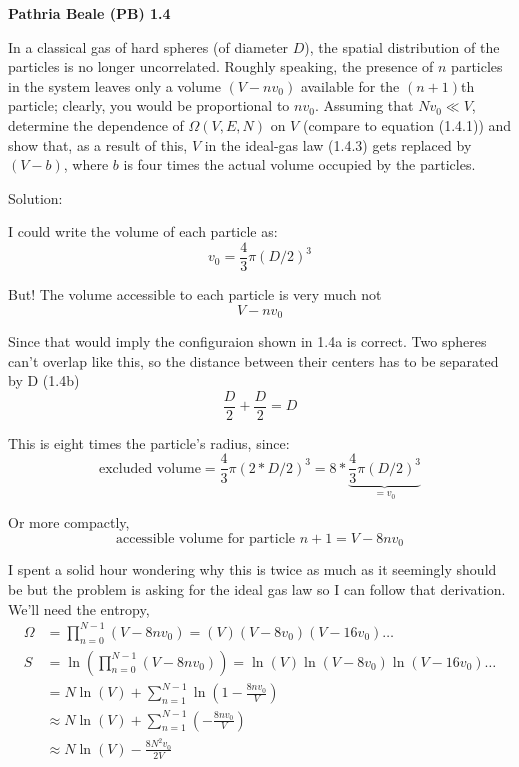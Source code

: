 \newpage
\begin{homeworkProblem}
    \textbf{Pathria Beale (PB) 1.4}

    In a classical gas of hard spheres (of diameter $D$), the spatial distribution of the particles is no longer uncorrelated. Roughly speaking, the presence of $n$ particles in the system leaves only a volume $(V-nv_0)$ available for the $(n+1)$th particle; clearly, you would be proportional to $nv_0$. Assuming that $Nv_0\ll V$, determine the dependence of $\Omega(V,E,N)$ on $V$ (compare to equation (1.4.1)) and show that, as a result of this, $V$ in the ideal-gas law (1.4.3) gets replaced by $(V-b)$, where $b$ is four times the actual volume occupied by the particles.

    \begin{callout}{Solution:}

    I could write the volume of each particle as:
    $$v_{0}= \frac{4}{3} \pi (D/2)^{3}$$

    But! The volume accessible to each particle is very much not 
    $$V-nv_{0}$$

    Since that would imply the configuraion shown in 1.4a is correct. Two spheres can't overlap like this, so the distance between their centers has to be separated by D (1.4b)
    $$\frac{D}{2}+\frac{D}{2}=D$$

    This is eight times the particle's radius, since:
    $$\text{excluded volume} = \frac{4}{3} \pi (2*D/2)^{3} = 8 * \underbrace{\frac{4}{3} \pi (D/2)^{3}}_{=v_{0}}$$


    Or more compactly,
    $$\text{accessible volume for particle $n+1$} = V-8nv_{0}$$

    I spent a solid hour wondering why this is twice as much as it seemingly should be but the problem is asking for the ideal gas law so I can follow that derivation. We'll need the entropy,
    \begin{align*}
        \Omega &= \prod_{n=0}^{N-1} (V-8nv_{0}) = (V)(V-8v_{0})(V-16v_{0})\dots \\ 
        S &= \ln \left( \prod_{n=0}^{N-1} (V-8nv_{0}) \right) = \ln(V)\ln(V-8v_{0})\ln(V-16v_{0})\dots \\ 
        &= N\ln(V) + \sum_{n=1}^{N-1} \ln \left( 1-\frac{8nv_{0}}{V} \right) \\
        &\approx N\ln(V) + \sum_{n=1}^{N-1} \left( -\frac{8nv_{0}}{V} \right) \\
        &\approx N\ln(V) -\frac{8N^{2}v_{0}}{2V} \\
    \end{align*}


\end{callout}
\end{homeworkProblem}
